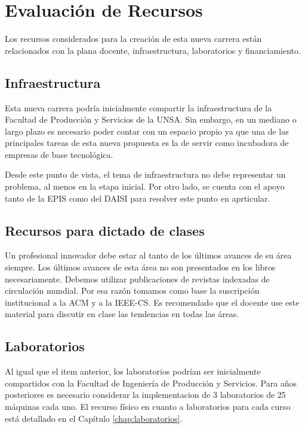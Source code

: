 \chapter{Evaluación de Recursos}\label{chap:cs-resources}

Los recursos considerados para la creación de esta nueva carrera están relacionados con la plana docente, infraestructura, laboratorios y financiamiento.

\OnlyUNSA{}

\section{Infraestructura}\label{sec:cs-infraestructura}
Esta nueva carrera podría inicialmente compartir la infraestructura de la Facultad de Producción y Servicios de la UNSA. Sin embargo, en un mediano o largo plazo es necesario poder contar con un espacio propio ya que una de las principales tareas de esta nueva propuesta es la de servir como incubadora de empresas de base tecnológica. 

Desde este punto de vista, el tema de infraestructura no debe representar un problema, al menos en la etapa inicial.
Por otro lado, se cuenta con el apoyo tanto de la EPIS como del DAISI para resolver este punto en aprticular.

\section{Recursos para dictado de clases}
Un profesional innovador debe estar al tanto de los últimos avances de su área siempre. Los últimos avances de esta área no son presentados en los libros necesariamente. Debemos utilizar publicaciones de revistas indexadas de circulación mundial. Por esa razón tomamos como base la suscripción institucional a la ACM y a la IEEE-CS. Es recomendado que el docente use este material para discutir en clase las tendencias en todas las áreas.

\section{Laboratorios}\label{sec:cs-labs}
Al igual que el item anterior, los laboratorios podrían ser inicialmente compartidos con la Facultad de Ingeniería de Producción y Servicios. Para años posteriores es necesario considerar la implementacion de 3 laboratorios de 25 máquinas cada uno. El recurso físico en cuanto a laboratorios para cada curso está detallado en el Capítulo \ref{chap:laboratorios}.

